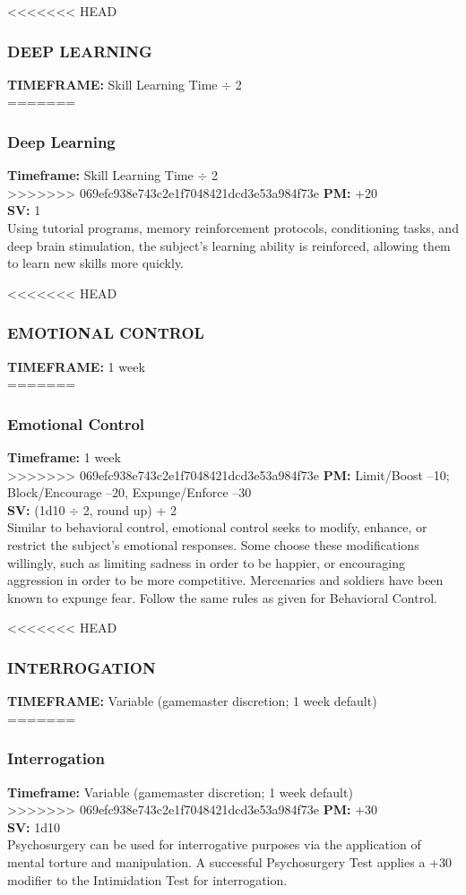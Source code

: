 <<<<<<< HEAD
\subsubsection{DEEP LEARNING}
\textbf{TIMEFRAME:} Skill Learning Time $\div$ 2 \\
=======
\subsubsection{Deep Learning}
\textbf{Timeframe:} Skill Learning Time $\div$ 2 \\
>>>>>>> 069efc938e743c2e1f7048421dcd3e53a984f73e
\textbf{PM:} +20 \\
\textbf{SV:} 1 \\
Using tutorial programs, memory reinforcement protocols,
conditioning tasks, and deep brain stimulation,
the subject’s learning ability is reinforced, allowing
them to learn new skills more quickly.

<<<<<<< HEAD
\subsubsection{EMOTIONAL CONTROL}
\textbf{TIMEFRAME:} 1 week \\
=======
\subsubsection{Emotional Control}
\textbf{Timeframe:} 1 week \\
>>>>>>> 069efc938e743c2e1f7048421dcd3e53a984f73e
\textbf{PM:} Limit/Boost –10; Block/Encourage –20, Expunge/Enforce –30 \\
\textbf{SV:} (1d10 $\div$ 2, round up) + 2 \\
Similar to behavioral control, emotional control seeks
to modify, enhance, or restrict the subject’s emotional
responses. Some choose these modifications willingly,
such as limiting sadness in order to be happier, or
encouraging aggression in order to be more competitive.
Mercenaries and soldiers have been known
to expunge fear. Follow the same rules as given for
Behavioral Control.


<<<<<<< HEAD
\subsubsection{INTERROGATION}
\textbf{TIMEFRAME:} Variable (gamemaster discretion; 1 week default) \\
=======
\subsubsection{Interrogation}
\textbf{Timeframe:} Variable (gamemaster discretion; 1 week default) \\
>>>>>>> 069efc938e743c2e1f7048421dcd3e53a984f73e
\textbf{PM:} +30 \\
\textbf{SV:} 1d10 \\
Psychosurgery can be used for interrogative purposes
via the application of mental torture and manipulation.
A successful Psychosurgery Test applies a +30
modifier to the Intimidation Test for interrogation.


